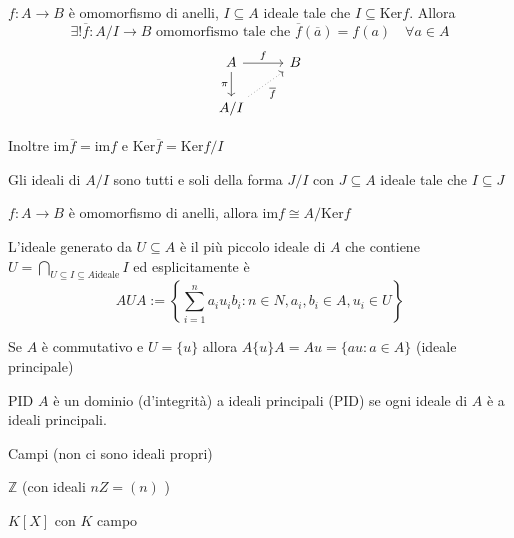 \begin{theorem}[Omomorfismo]
    \(f : A\to B\) è omomorfismo di anelli, \(I \subseteq A \) ideale tale che
    \(I \subseteq \mathrm{Ker}f \). Allora
    \[
      \exists ! \overline{f} : A / I \to  B \text{ omomorfismo tale che } \overline{f}{(\overline{a})} = f{(a)} \quad \forall  a \in A
    \]
\[\begin{tikzcd}
	A & B \\
	{A / I}
	\arrow["f", from=1-1, to=1-2]
	\arrow["\pi"', from=1-1, to=2-1]
	\arrow["{\overline{f}}"', dotted, from=2-1, to=1-2]
\end{tikzcd}\]

Inoltre \(\mathrm{im}\overline{f} = \mathrm{im}f\) e \(\mathrm{Ker}\overline{f} = \mathrm{Ker} f / I\) 
\end{theorem}
\begin{proposition}{}
    Gli ideali di \(A / I\) sono tutti e soli della forma \(J / I\) con \(J \subseteq A \) ideale tale che \(I \subseteq J \) 
\end{proposition}


\begin{theorem}
    \(f : A \to B\) è omomorfismo di anelli, allora \(\mathrm{im}f \cong A / \mathrm{Ker}f\)  
\end{theorem}

\begin{definition}{}
    L'ideale generato da \(U \subseteq A \) è il più piccolo ideale di \(A\) che
    contiene \(U = \bigcap_{U \subseteq I \subseteq A \text{ideale}} I \) ed
    esplicitamente è 
    \[
      A U A := \left\{\sum_{i=1}^{n} a_{i} u_{i} b_{i} : n \in N, a_{i}, b_{i} \in A, u_{i} \in U \right\} 
    \]
\end{definition}
\begin{remark}{}
    Se \(A\) è commutativo e \(U = \{u\} \) allora \(A \{ u \} A = Au = \{au : a
    \in A\} \) (ideale principale)
\end{remark}
\begin{definition}{PID}
    \(A\) è un dominio (d'integrità) a ideali principali (PID) se ogni ideale di
    \(A\) è a ideali principali.
\end{definition}
\begin{example}{}
    Campi (non ci sono ideali propri)
\end{example}
\begin{example}{}
    \(\mathbb{Z}\) (con ideali \(nZ = (n)\) )
\end{example}
\begin{example}{}
    \(K[X]\) con \(K\) campo
\end{example}
